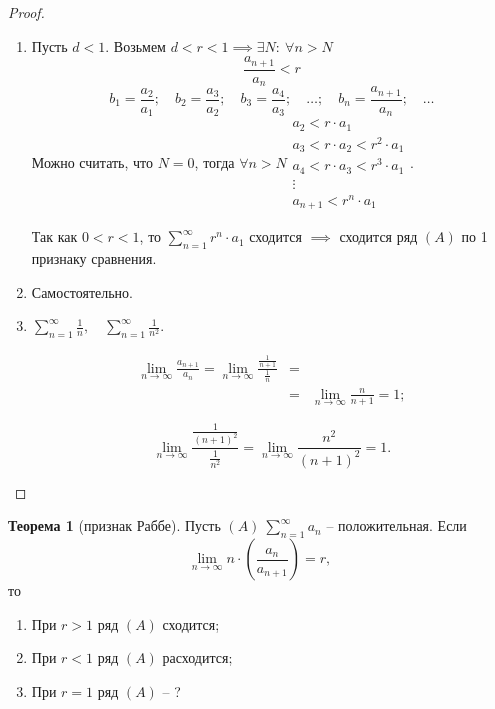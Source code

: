 \documentclass{report}
\theoremstyle{definition}
\newtheorem{theorem}{Теорема}[section]
\begin{document}
\begin{proof}
  \begin{enumerate}
    \item Пусть $d < 1$. Возьмем $d < r < 1 \implies \exists N: \ \forall n > N$
          \begin{equation*}
            \frac{a_{n+1}}{a_n}<r
          \end{equation*}
          \begin{equation*}
            b_1 = \frac{a_2}{a_1}; \quad b_2 = \frac{a_3}{a_2}; \quad b_3 = \frac{a_4}{a_3}; \quad \ldots; \quad b_n = \frac{a_{n+1}}{a_n}; \quad \ldots
          \end{equation*}
          Можно считать, что $N=0$, тогда $\forall n > N \begin{array}{l}
              a_2 < r \cdot a_1                 \\
              a_3 < r \cdot a_2 < r^2 \cdot a_1 \\
              a_4 < r \cdot a_3 < r^3 \cdot a_1 \\
              \vdots                            \\
              a_{n+1} < r^n \cdot a_1
            \end{array}$.

          Так как $0 < r < 1$, то $\sum_{n=1}^{\infty} r^n \cdot a_1$ сходится $\implies$ сходится ряд $(A)$ по 1 признаку сравнения.
    \item Самостоятельно.
    \item $\sum_{n=1}^{\infty}\frac{1}{n}, \quad \sum_{n=1}^{\infty}\frac{1}{n^2}$.

          \begin{eqnarray*}
            \underset{n\rightarrow\infty}{\lim}\frac{a_{n+1}}{a_n} = \underset{n\rightarrow\infty}{\lim}\frac{\frac{1}{n+1}}{\frac{1}{n}} & = & \\
            & = & \underset{n\rightarrow\infty}{\lim}\frac{n}{n+1} = 1;
          \end{eqnarray*}

          \begin{equation*}
            \underset{n\rightarrow\infty}{\lim}\frac{\frac{1}{(n+1)^2}}{\frac{1}{n^2}} = \underset{n\rightarrow\infty}{\lim}\frac{n^2}{(n+1)^2} = 1.
          \end{equation*}
  \end{enumerate}
\end{proof}

\begin{theorem}[признак Раббе]
  Пусть $(A) \ \sum_{n=1}^{\infty}a_n$ -- положительная. Если
  \begin{equation*}
    \underset{n\rightarrow\infty}{\lim}n \cdot (\frac{a_n}{a_{n+1}}) = r,
  \end{equation*}
  то
  \begin{enumerate}
    \item При $r>1$ ряд $(A)$ сходится;
    \item При $r<1$ ряд $(A)$ расходится;
    \item При $r=1$ ряд $(A)$ -- ?
  \end{enumerate}
\end{theorem}
\end{document}

